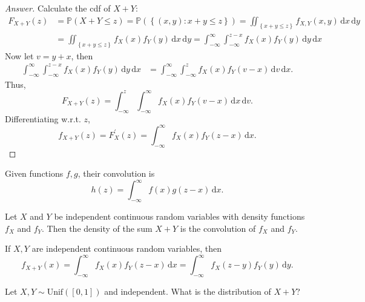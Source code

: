 \begin{proof}[Answer]
    Calculate the cdf of \(X + Y\):
    \begin{align*}
        F_{X + Y}(z) &= \mathbb{P} (X + Y \le z) = \mathbb{P} (\left\{ (x, y): x + y \le z \right\} ) = \iint_{\left\{ x+y \le z \right\} } f_{X, Y}(x, y) \, \mathrm{d} x \, \mathrm{d} y \\
        &= \iint_{\left\{ x+y \le z \right\} } f_X(x) f_Y(y) \, \mathrm{d} x \, \mathrm{d} y = \int _{-\infty }^{\infty} \int _{-\infty }^{z - x} f_X(x) f_Y(y) \, \mathrm{d} y \, \mathrm{d} x    
    \end{align*} 
    Now let \(v = y + x\), then 
    \begin{align*}
       \int _{-\infty }^{\infty} \int _{-\infty }^{z - x} f_X(x) f_Y(y) \, \mathrm{d} y \, \mathrm{d} x &= \int _{-\infty }^{\infty} \int _{-\infty }^{z} f_X(x) f_Y(v - x) \, \mathrm{d} v \, \mathrm{d} x .  
    \end{align*} 
    Thus,
    \[
        F_{X+Y}(z) = \int _{-\infty }^z \int _{-\infty }^{\infty} f_X(x) f_Y(v-x) \, \mathrm{d} x \, \mathrm{d} v.  
    \]
    Differentiating w.r.t. \(z\),
    \[
        f_{X+Y}(z) = F_X^{\prime} (z) = \int _{-\infty }^{\infty} f_X(x) f_Y(z - x) \, \mathrm{d} x. 
    \] 
\end{proof}

\begin{definition}
    Given functions \(f, g\), their convolution is 
    \[
        h(z) = \int _{-\infty }^{\infty } f(x) g(z - x) \, \mathrm{d} x .  
    \] 
\end{definition}

\begin{proposition}
    Let \(X\) and \(Y\) be independent continuous random variables with density functions \(f_X\) and \(f_Y\). Then the density of the sum \(X + Y\) is the convolution of \(f_X\) and \(f_Y\).       
\end{proposition}

\begin{corollary}
    If \(X, Y\) are independent continuous random variables, then  
    \[
        f_{X + Y}(x) = \int _{-\infty }^{\infty } f_X(x) f_Y(z - x) \, \mathrm{d} x = \int _{-\infty }^{\infty} f_X(z - y) f_Y(y) \, \mathrm{d} y.  
    \]
\end{corollary}

\begin{eg}
    Let \(X, Y \sim \mathrm{Unif}([0, 1]) \) and independent. What is the distribution of \(X + Y\)?  
\end{eg}


